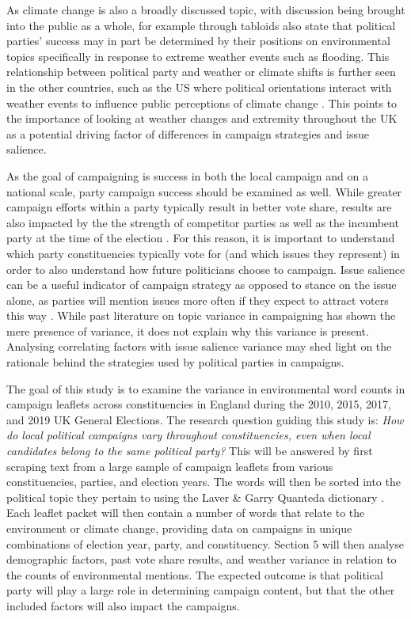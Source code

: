 \documentclass[preprint,12pt,authoryear]{elsarticle}
\begin{document}
As climate change is also a broadly discussed topic, with discussion being brought into the public as a whole, for example through tabloids \citep{farstadWhatExplainsVariation2018} \citet{birchElectoralBenefitsEnvironmental2023} also state that political parties' success may in part be determined by their positions on environmental topics specifically in response to extreme weather events such as flooding. This relationship between political party and weather or climate shifts is further seen in the other countries, such as the US where political orientations interact with weather events to influence public perceptions of climate change \cite{shaoSeeingBelievingExamination2016}. This points to the importance of looking at weather changes and extremity throughout the UK as a potential driving factor of differences in campaign strategies and issue salience.

As the goal of campaigning is success in both the local campaign and on a national scale, party campaign success should be examined as well. While greater campaign efforts within a party typically result in better vote share, results are also impacted by the the strength of competitor parties as well as the incumbent party at the time of the election \citep{pattieIncumbentPartiesIncumbent2017a}. For this reason, it is important to understand which party constituencies typically vote for (and which issues they represent) in order to also understand how future politicians choose to campaign. Issue salience can be a useful indicator of campaign strategy as opposed to stance on the issue alone, as parties will mention issues more often if they expect to attract voters this way \citep{pogorelisIssueSalienceRegional2005}. While past literature on topic variance in campaigning has shown the mere presence of variance, it does not explain why this variance is present. Analysing correlating factors with issue salience variance may shed light on the rationale behind the strategies used by political parties in campaigns. 

The goal of this study is to examine the variance in environmental word counts in campaign leaflets across constituencies in England during the 2010, 2015, 2017, and 2019 UK General Elections. The research question guiding this study is: \textit{How do local political campaigns vary throughout constituencies, even when local candidates belong to the same political party?} This will be answered by first scraping text from a large sample of campaign leaflets from various constituencies, parties, and election years. The words will then be sorted into the political topic they pertain to using the Laver \& Garry Quanteda dictionary \citep{laverEstimatingPolicyPositions2000}. Each leaflet packet will then contain a number of words that relate to the environment or climate change, providing data on campaigns in unique combinations of election year, party, and constituency. Section 5 will then analyse demographic factors, past vote share results, and weather variance in relation to the counts of environmental mentions. The expected outcome is that political party will play a large role in determining campaign content, but that the other included factors will also impact the campaigns.
\end{document}
